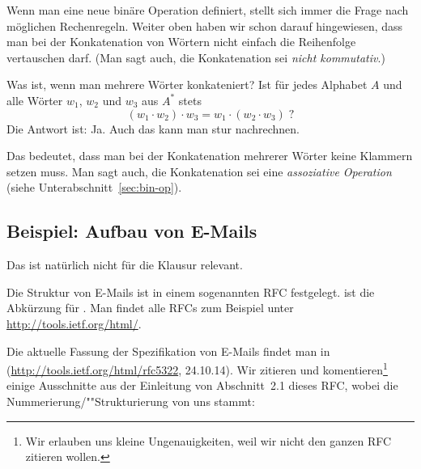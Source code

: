 Wenn man eine neue binäre Operation definiert, stellt sich immer die
Frage nach möglichen Rechenregeln. Weiter oben haben wir schon darauf
hingewiesen, dass man bei der Konkatenation von Wörtern nicht einfach
die Reihenfolge vertauschen darf. (Man sagt auch, die Konkatenation
sei \emph{nicht kommutativ}.)

Was ist, wenn man mehrere Wörter konkateniert? Ist für jedes Alphabet
$A$ und alle Wörter $w_1$, $w_2$ und $w_3$ aus $A^*$ stets
%
\[
(w_1 \cdot w_2) \cdot w_3 = w_1 \cdot(w_2 \cdot w_3)   \;?
\]
%
Die Antwort ist: Ja. Auch das kann man stur nachrechnen.

Das bedeutet, dass man bei der Konkatenation mehrerer Wörter keine
Klammern setzen muss. Man sagt auch, die Konkatenation sei eine
\emph{assoziative Operation} (siehe
Unterabschnitt~\ref{sec:bin-op}).

\Tut\subsection{Beispiel: Aufbau von E-Mails}
\label{subsec:woerter-aufbau-emails}

\begin{tutorium}
  Das ist natürlich nicht für die Klausur relevant.
\end{tutorium}
%
Die Struktur von E-Mails ist in einem sogenannten RFC festgelegt.
 ist die Abkürzung für . Man
findet alle RFCs zum Beispiel unter \url{http://tools.ietf.org/html/}.

Die aktuelle Fassung der Spezifikation von E-Mails
findet man in %
(\url{http://tools.ietf.org/html/rfc5322}, 24.10.14).  Wir zitieren
und komentieren\footnote{Wir erlauben uns kleine Ungenauigkeiten, weil
  wir nicht den ganzen RFC zitieren wollen.}  einige Ausschnitte aus
der Einleitung von Abschnitt~2.1 dieses RFC, wobei die
Nummerierung/""Strukturierung von uns stammt:

